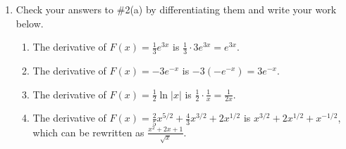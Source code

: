\documentclass{article}
\begin{document}
\begin{enumerate}
\begin{enumerate}
\begin{enumerate}
        \begin{solution}
          We can rewrite $\displaystyle f(x) = \frac{1}{2} \cdot
          \frac{1}{x}$, so $F(x) = \boxed{\dfrac{1}{2} \ln |x|}$ is one
          antiderivative.
        \end{solution}

      \item
        \begin{problem}[\vfill]
          $f(x) = \dfrac{(x + 1)^2}{\sqrt{x}}$ \\
          \emph{Hint: expand the numerator so you can break up the 
          fraction into the sum of simpler pieces.}
        \end{problem}

        \begin{solution}
          We don't have a Quotient Rule for antiderivatives, so let's
          first expand this out: $\displaystyle f(x) = \frac{x^2 + 2x +
            1}{\sqrt{x}} = x^{3/2} + 2 x^{1/2} + x^{-1/2}$.  Then, one
          antiderivative of $f$ is $F(x) = \boxed{\frac{2}{5} x^{5/2} +
            \frac{4}{3} x^{3/2} + 2 x^{1/2}}$.
        \end{solution}

      \end{enumerate}
      \probonly{}

  \item
    \begin{problem}[\nstretch{2}]
      Check your answers to {{{{\#2}}(a)}} by
      differentiating them and write your work below.
    \end{problem}

    \begin{solution}
      \begin{enumerate}
      \item The derivative of $F(x) = \frac{1}{3} e^{3x}$ is $\frac{1}{3}
        \cdot 3 e^{3x} = e^{3x}$.
      \item The derivative of $F(x) = - 3 e^{-x}$ is $- 3 \left( - e^{-x}
        \right) = 3 e^{-x}$.
      \item The derivative of $F(x) = \frac{1}{2} \ln |x|$ is $\frac{1}{2}
        \cdot \frac{1}{x} = \frac{1}{2x}$.
      \item The derivative of $F(x) = \frac{2}{5} x^{5/2} +
            \frac{4}{3} x^{3/2} + 2 x^{1/2}$ is $x^{3/2} + 2 x^{1/2} +
            x^{-1/2}$, which can be rewritten as $\frac{x^2 + 2x +
              1}{\sqrt{x}}$. 
      \end{enumerate}
    \end{solution}


\end{enumerate}
\end{enumerate}
\end{document}
